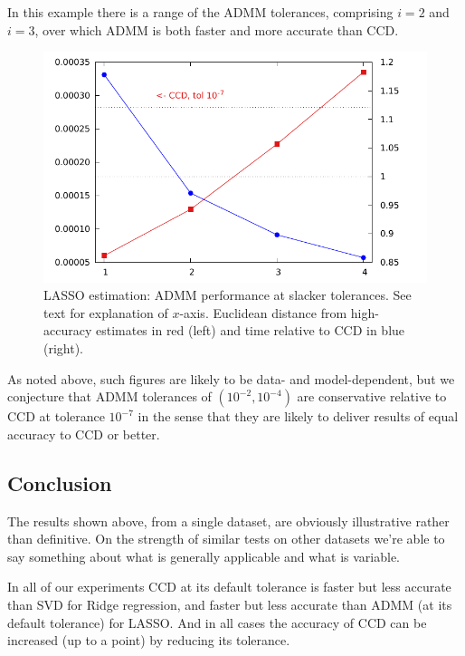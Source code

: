 \documentclass{article}
\begin{document}
In this example there is a range of the ADMM tolerances, comprising
$i=2$ and $i=3$, over which ADMM is both faster and more accurate than
CCD.

\begin{figure}[htbp]
\begin{center}
\includegraphics[scale=0.9]{admm_ccd.pdf}
\caption{LASSO estimation: ADMM performance at slacker tolerances.
  See text for explanation of $x$-axis. Euclidean distance from
  high-accuracy estimates in red (left) and time relative to CCD in
  blue (right).}
\label{fig:admm-seq}
\end{center}
\end{figure}

As noted above, such figures are likely to be data- and
model-dependent, but we conjecture that ADMM tolerances of
$(10^{-2}, 10^{-4})$ are conservative relative to CCD at tolerance
$10^{-7}$ in the sense that they are likely to deliver results of
equal accuracy to CCD or better.

\subsection*{Conclusion}

The results shown above, from a single dataset, are obviously
illustrative rather than definitive. On the strength of similar tests
on other datasets we're able to say something about what is generally
applicable and what is variable.

In all of our experiments CCD at its default tolerance is faster but
less accurate than SVD for Ridge regression, and faster but less
accurate than ADMM (at its default tolerance) for LASSO. And in all
cases the accuracy of CCD can be increased (up to a point) by
reducing its tolerance.
\end{document}
